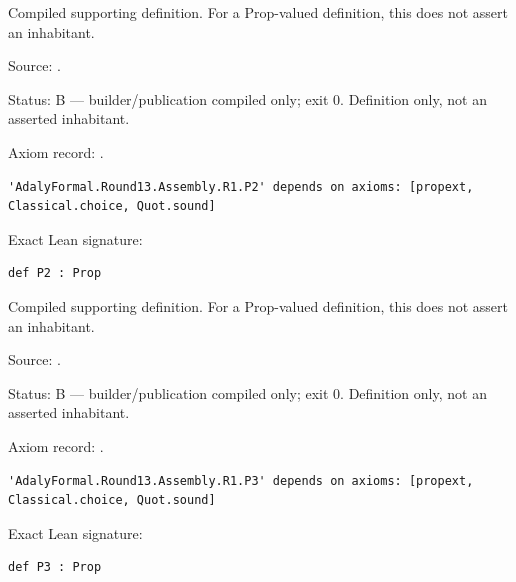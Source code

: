 \begin{definition}[bp-556]
\label{bp-556}
\leanok
Compiled supporting definition. For a Prop-valued definition, this does not assert an inhabitant.

\par Source: \texttt{}.
\par Status: B — builder/publication compiled only; exit 0. Definition only, not an asserted inhabitant.
\par Axiom record: \texttt{}.
\begin{verbatim}
'AdalyFormal.Round13.Assembly.R1.P2' depends on axioms: [propext, Classical.choice, Quot.sound]
\end{verbatim}
\par Exact Lean signature:
\begin{verbatim}
def P2 : Prop
\end{verbatim}
\end{definition}

\begin{definition}[bp-557]
\label{bp-557}
\uses{}
\leanok
Compiled supporting definition. For a Prop-valued definition, this does not assert an inhabitant.

\par Source: \texttt{}.
\par Status: B — builder/publication compiled only; exit 0. Definition only, not an asserted inhabitant.
\par Axiom record: \texttt{}.
\begin{verbatim}
'AdalyFormal.Round13.Assembly.R1.P3' depends on axioms: [propext, Classical.choice, Quot.sound]
\end{verbatim}
\par Exact Lean signature:
\begin{verbatim}
def P3 : Prop
\end{verbatim}
\end{definition}

